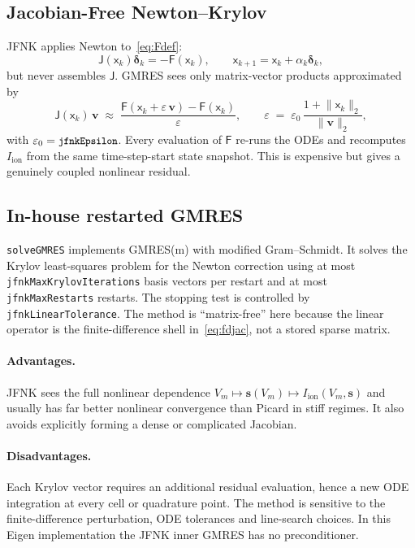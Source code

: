 \documentclass[11pt,a4paper]{article}
\newcommand{\Vm}{V_{m}}
\newcommand{\Iion}{I_{\text{ion}}}
\newcommand{\code}[1]{\texttt{\small #1}}
\begin{document}
\subsection{Jacobian-Free Newton--Krylov}

JFNK applies Newton to~\eqref{eq:Fdef}:
\[
  \mathsf{J}(\mathsf{x}_k)\boldsymbol{\delta}_k
  =
  -\mathsf{F}(\mathsf{x}_k),
  \qquad
  \mathsf{x}_{k+1}=\mathsf{x}_k+\alpha_k\boldsymbol{\delta}_k,
\]
but never assembles $\mathsf{J}$. GMRES sees only matrix-vector
products approximated by
\begin{equation}
  \mathsf{J}(\mathsf{x}_{k})\, \mathbf{v}
   \;\approx\;
   \frac{\mathsf{F}(\mathsf{x}_{k} + \varepsilon\, \mathbf{v})
         - \mathsf{F}(\mathsf{x}_{k})}{\varepsilon},
   \qquad
   \varepsilon \;=\; \varepsilon_{0}\,
                     \frac{1 + \lVert \mathsf{x}_{k} \rVert_{2}}
                          {\lVert \mathbf{v} \rVert_{2}},
   \label{eq:fdjac}
\end{equation}
with $\varepsilon_{0}=\code{jfnkEpsilon}$. Every evaluation of
$\mathsf{F}$ re-runs the ODEs and recomputes $\Iion$ from the same
time-step-start state snapshot. This is expensive but gives a genuinely
coupled nonlinear residual.

\subsection{In-house restarted GMRES}

\code{solveGMRES} implements GMRES(m) with modified Gram--Schmidt. It
solves the Krylov least-squares problem for the Newton correction using
at most \code{jfnkMaxKrylovIterations} basis vectors per restart and at
most \code{jfnkMaxRestarts} restarts. The stopping test is controlled by
\code{jfnkLinearTolerance}. The method is ``matrix-free'' here because
the linear operator is the finite-difference shell in~\eqref{eq:fdjac},
not a stored sparse matrix.

\paragraph{Advantages.}
JFNK sees the full nonlinear dependence
$\Vm\mapsto\mathbf{s}(\Vm)\mapsto\Iion(\Vm,\mathbf{s})$ and usually has
far better nonlinear convergence than Picard in stiff regimes. It also
avoids explicitly forming a dense or complicated Jacobian.

\paragraph{Disadvantages.}
Each Krylov vector requires an additional residual evaluation, hence a
new ODE integration at every cell or quadrature point. The method is
sensitive to the finite-difference perturbation, ODE tolerances and
line-search choices. In this Eigen implementation the JFNK inner GMRES
has no preconditioner.
\end{document}
